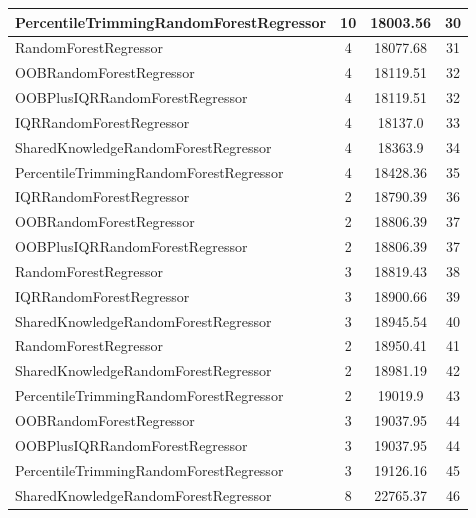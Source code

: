 \begin{table}[h]
\centering
\begin{tabular}{|l|c|c|c|}
\hline
\textcolor[HTML]{f46a9b}{PercentileTrimmingRandomForestRegressor} & 10 & 18003.56 & 30 \\ \hline
\textcolor[HTML]{87bc45}{RandomForestRegressor} & 4 & 18077.68 & 31 \\ \hline
\textcolor[HTML]{b33dc6}{OOBRandomForestRegressor} & 4 & 18119.51 & 32 \\ \hline
\textcolor[HTML]{ede15b}{OOBPlusIQRRandomForestRegressor} & 4 & 18119.51 & 32 \\ \hline
\textcolor[HTML]{27aeef}{IQRRandomForestRegressor} & 4 & 18137.0 & 33 \\ \hline
\textcolor[HTML]{ef9b20}{SharedKnowledgeRandomForestRegressor} & 4 & 18363.9 & 34 \\ \hline
\textcolor[HTML]{f46a9b}{PercentileTrimmingRandomForestRegressor} & 4 & 18428.36 & 35 \\ \hline
\textcolor[HTML]{27aeef}{IQRRandomForestRegressor} & 2 & 18790.39 & 36 \\ \hline
\textcolor[HTML]{b33dc6}{OOBRandomForestRegressor} & 2 & 18806.39 & 37 \\ \hline
\textcolor[HTML]{ede15b}{OOBPlusIQRRandomForestRegressor} & 2 & 18806.39 & 37 \\ \hline
\textcolor[HTML]{87bc45}{RandomForestRegressor} & 3 & 18819.43 & 38 \\ \hline
\textcolor[HTML]{27aeef}{IQRRandomForestRegressor} & 3 & 18900.66 & 39 \\ \hline
\textcolor[HTML]{ef9b20}{SharedKnowledgeRandomForestRegressor} & 3 & 18945.54 & 40 \\ \hline
\textcolor[HTML]{87bc45}{RandomForestRegressor} & 2 & 18950.41 & 41 \\ \hline
\textcolor[HTML]{ef9b20}{SharedKnowledgeRandomForestRegressor} & 2 & 18981.19 & 42 \\ \hline
\textcolor[HTML]{f46a9b}{PercentileTrimmingRandomForestRegressor} & 2 & 19019.9 & 43 \\ \hline
\textcolor[HTML]{b33dc6}{OOBRandomForestRegressor} & 3 & 19037.95 & 44 \\ \hline
\textcolor[HTML]{ede15b}{OOBPlusIQRRandomForestRegressor} & 3 & 19037.95 & 44 \\ \hline
\textcolor[HTML]{f46a9b}{PercentileTrimmingRandomForestRegressor} & 3 & 19126.16 & 45 \\ \hline
\textcolor[HTML]{ef9b20}{SharedKnowledgeRandomForestRegressor} & 8 & 22765.37 & 46 \\ \hline

\end{tabular}
\end{table}
